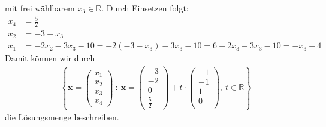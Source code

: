 mit frei wählbarem $x_3 \in \mathbb{R}$.
Durch Einsetzen folgt:
\begin{align*}
x_4 &= \frac{5}{2}\\
x_2 &= -3 -x_3 \\
x_1 &= -2 x_2 - 3 x_3 - 10  = -2 (-3 - x_3)  - 3 x_3 -10 
= 6 + 2 x_3 - 3 x_3 - 10
= - x_3 - 4
\end{align*}
Damit können wir durch
\begin{align*}
\left\lbrace
\textbf{x} =
\begin{pmatrix}
x_1 \\
x_2 \\
x_3 \\ 
x_4
\end{pmatrix}
\ : \ 
\textbf{x} 
=
\begin{pmatrix}
-3\\
-2\\
0\\
\frac{5}{2}
\end{pmatrix}
+ t \cdot 
\begin{pmatrix}
-1\\
-1\\
1\\
0\\
\end{pmatrix},
\ t \in \mathbb{R}
\right\rbrace
\end{align*}
die Lösungsmenge beschreiben.